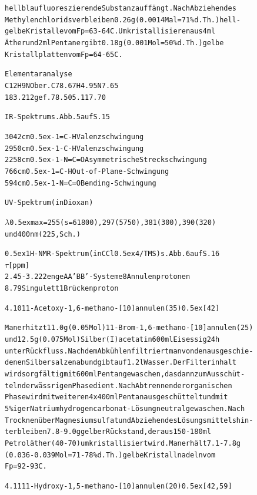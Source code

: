 \documentclass[a4paper,11pt]{article}
\begin{document}
\begin{alltt}
\newpage
{}


hellblau fluoreszierende Substanz auffängt. Nach Abziehen des
Methylenchlorids verbleiben 0.26 g (0.0014 Mal = 71 \% d.Th.) hell-
gelbe Kristalle vom Fp = 63 - 64\degree{}C. Umkristallisieren aus 4 ml
Äther und 2 ml Pentan ergibt 0.18 g (0.001 Mol = 50 \% d.Th.) gelbe
Kristallplatten vom Fp = 64 - 65\degree{}C.

Elementaranalyse
C12H9NO    ber.     C  78.67   H  4.95   N  7.65
183.212    gef.        78.50      5.11      7.70

IR-Spektrum s. Abb. 5 auf S. 15

3042 cm\raise0.5ex\hbox{-1}    =C-H     Valenzschwingung
2950 cm\raise0.5ex\hbox{-1}    -C-H     Valenzschwingung
2258 cm\raise0.5ex\hbox{-1}    -N=C=O   Asymmetrische Streckschwingung
 766 cm\raise0.5ex\hbox{-1}    =C-H     Out-of-Plane-Schwingung
 594 cm\raise0.5ex\hbox{-1}    -N=C=O   Bending-Schwingung

UV-Spektrum (in Dioxan)

\(\lambda\)\lower0.5ex\hbox{max} = 255 (s = 61800), 297 (5750), 381 (300), 390 (320)
und 400 nm (225, Sch.)

 

\leavevmode\raise0.5ex\hbox{1}H-NMR-Spektrum (in CCl\lower0.5ex\hbox{4}/TMS) s. Abb. 6 auf S. 16
  \(\tau\) [ppm]
2.45 - 3.22   2 enge AA'BB'-Systeme  8 Annulenprotonen
8.79          Singulett              1 Brückenproton

\newpage
{}


4.10 11-Acetoxy-1,6-methano-[10]annulen (35) \raise0.5ex\hbox{[42]}
 
Man erhitzt 11.0 g (0.05 Mol) 11-Brom-1,6-methano-[10]annulen (25)
und 12.5 g (0.075 Mol) Silber(I)acetat in 600 ml Eisessig 24 h
unter Rückfluss. Nach dem Abkühlen filtriert man von den ausgeschie-
denen Silbersalzen ab und gibt auf 1.2 l Wasser. Der Filterinhalt
wird sorgfältig mit 600 ml Pentan gewaschen, das dann zum Ausschüt-
teln der wässrigen Phase dient. Nach Abtrennen der organischen
Phase wird mit weiteren 4 x 400 ml Pentan ausgeschüttelt und mit
5 \%iger Natriumhydrogencarbonat-Lösung neutral gewaschen. Nach
Trocknen über Magnesiumsulfat und Abziehen des Lösungsmittels hin-
terbleiben 7.8 - 9.0 g gelber Rückstand, der aus 150 - 180 ml
Petroläther (40-70) umkristallisiert wird. Man erhält 7.1 - 7.8 g
(0.036 - 0.039 Mol = 71 - 78 \% d.Th.) gelbe Kristallnadeln vom
Fp = 92 - 93\degree{}C.


4.11 11-Hydroxy-1,5-methano-[10]annulen (20) \raise0.5ex\hbox{[42,59]}


\end{alltt}
\end{document}
